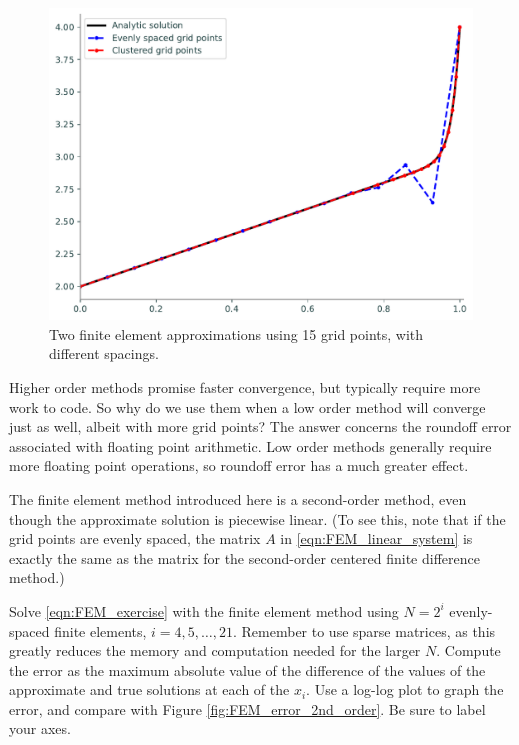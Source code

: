 \begin{figure}[ht]
\centering
\includegraphics[width=\textwidth]{figures/FEM_compare_methods.pdf}
\caption{Two finite element approximations using 15 grid points, with different spacings. }
\label{fig:FEM_compare_methods}
\end{figure}

\begin{problem}
\label{prob:FEM_accuracy_comparison}
Higher order methods promise faster convergence, but typically require more work to code.
So why do we use them when a low order method will converge just as well, albeit with more grid points?
The answer concerns the roundoff error associated with floating point arithmetic.
Low order methods generally require more floating point operations, so roundoff error has a much greater effect.

The finite element method introduced here is a second-order method, even though the approximate solution is piecewise linear.
(To see this, note that if the grid points are evenly spaced, the matrix $A$ in \eqref{eqn:FEM_linear_system} is exactly the same as the matrix for the second-order centered finite difference method.)

Solve \eqref{eqn:FEM_exercise} with the finite element method using $N = 2^i$ evenly-spaced finite elements, $i = 4, 5, \ldots, 21$.
Remember to use sparse matrices, as this greatly reduces the memory and computation needed for the larger \(N\).
Compute the error as the maximum absolute value of the difference of the values of the approximate and true solutions at each of the \(x_i\).
Use a log-log plot to graph the error, and compare with Figure \ref{fig:FEM_error_2nd_order}.
Be sure to label your axes.
\end{problem}


